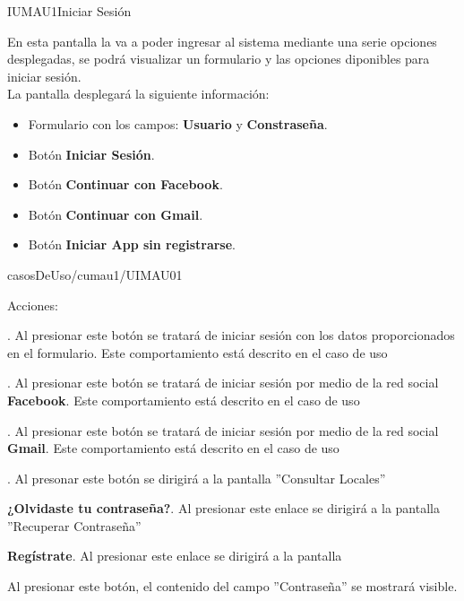
\begin{IU}{IUMAU1}{Iniciar Sesión}{En esta pantalla la  va a poder ingresar al sistema mediante una serie opciones desplegadas, se podrá visualizar un formulario y las opciones diponibles para iniciar sesión.\\
		
La pantalla desplegará la siguiente información:
\begin{itemize}
	\item Formulario con los campos: \textbf{Usuario} y \textbf{Constraseña}.
	\item Botón \textbf{Iniciar Sesión}.
	\item Botón \textbf{Continuar con Facebook}.
	\item Botón \textbf{Continuar con Gmail}.
	\item Botón \textbf{Iniciar App sin registrarse}.
\end{itemize}}{casosDeUso/cumau1/UIMAU01}

	\item[Acciones:]\hspace{1pt}
	\begin{Citemize}
		\item {}. Al presionar este botón se tratará de iniciar sesión con los datos proporcionados en el formulario. Este comportamiento está descrito en el caso de uso 
		
		\item {}. Al presionar este botón se tratará de iniciar sesión por medio de la red social \textbf{Facebook}. Este comportamiento está descrito en el caso de uso 
		
		\item {}. Al presionar este botón se tratará de iniciar sesión por medio de la red social \textbf{Gmail}. Este comportamiento está descrito en el caso de uso 
		
		\item {}. Al presonar este botón se dirigirá a la pantalla ''Consultar Locales''
		
		\item \textbf{¿Olvidaste tu contraseña?}. Al presionar este enlace se dirigirá a la pantalla ''Recuperar Contraseña''
		
		\item \textbf{Regístrate}. Al presionar este enlace se dirigirá a la pantalla 
		
		\item \slasheyeIcon{} Al presionar este botón, el contenido del campo ''Contraseña'' se mostrará visible.
	\end{Citemize}
\end{IU}
